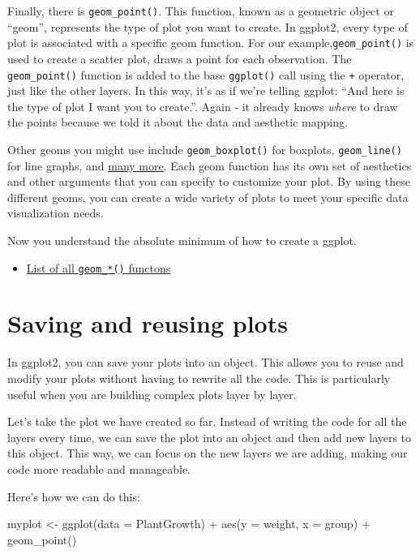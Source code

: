 \documentclass[
  letterpaper,
  DIV=11,
  numbers=noendperiod]{scrartcl}
\newenvironment{Shaded}{\begin{snugshade}}{\end{snugshade}}
\newcommand{\AttributeTok}[1]{\textcolor[rgb]{0.40,0.45,0.13}{#1}}
\newcommand{\FunctionTok}[1]{\textcolor[rgb]{0.28,0.35,0.67}{#1}}
\newcommand{\NormalTok}[1]{\textcolor[rgb]{0.00,0.23,0.31}{#1}}
\newcommand{\OtherTok}[1]{\textcolor[rgb]{0.00,0.23,0.31}{#1}}
\newcommand{\SpecialCharTok}[1]{\textcolor[rgb]{0.37,0.37,0.37}{#1}}
\providecommand{\tightlist}{%
  \setlength{\itemsep}{0pt}\setlength{\parskip}{0pt}}\usepackage{longtable,booktabs,array}
\begin{document}
Finally, there is \texttt{geom\_point()}. This function, known as a
geometric object or ``geom'', represents the type of plot you want to
create. In ggplot2, every type of plot is associated with a specific
geom function. For our example,\texttt{geom\_point()} is used to create
a scatter plot, draws a point for each observation. The
\texttt{geom\_point()} function is added to the base \texttt{ggplot()}
call using the \texttt{+} operator, just like the other layers. In this
way, it's as if we're telling ggplot: ``And here is the type of plot I
want you to create.''. Again - it already knows \emph{where} to draw the
points because we told it about the data and aesthetic mapping.

Other geoms you might use include \texttt{geom\_boxplot()} for boxplots,
\texttt{geom\_line()} for line graphs, and
\href{https://ggplot2.tidyverse.org/reference/\#geoms}{many more}. Each
geom function has its own set of aesthetics and other arguments that you
can specify to customize your plot. By using these different geoms, you
can create a wide variety of plots to meet your specific data
visualization needs.

Now you understand the absolute minimum of how to create a ggplot.

\begin{itemize}
\tightlist
\item
  \href{https://ggplot2.tidyverse.org/reference/\#geoms}{List of all
  \texttt{geom\_*()} functons}
\end{itemize}

\hypertarget{saving-and-reusing-plots}{%
\section{Saving and reusing plots}\label{saving-and-reusing-plots}}

In ggplot2, you can save your plots into an object. This allows you to
reuse and modify your plots without having to rewrite all the code. This
is particularly useful when you are building complex plots layer by
layer.

Let's take the plot we have created so far. Instead of writing the code
for all the layers every time, we can save the plot into an object and
then add new layers to this object. This way, we can focus on the new
layers we are adding, making our code more readable and manageable.

Here's how we can do this:

\begin{Shaded}
\begin{Highlighting}[]
\NormalTok{myplot }\OtherTok{\textless{}{-}} \FunctionTok{ggplot}\NormalTok{(}\AttributeTok{data =}\NormalTok{ PlantGrowth) }\SpecialCharTok{+}
  \FunctionTok{aes}\NormalTok{(}\AttributeTok{y =}\NormalTok{ weight, }\AttributeTok{x =}\NormalTok{ group) }\SpecialCharTok{+}
  \FunctionTok{geom\_point}\NormalTok{()}
\end{Highlighting}
\end{Shaded}
\end{document}

